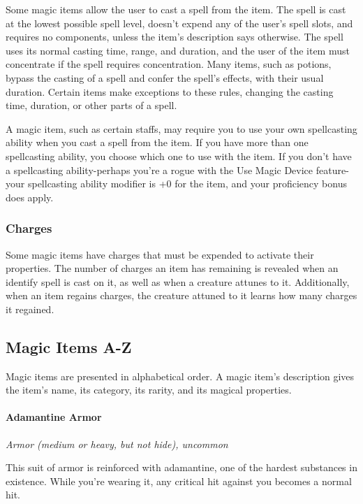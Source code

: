 \documentclass[
]{article}
\begin{document}
Some magic items allow the user to cast a spell from the item. The spell
is cast at the lowest possible spell level, doesn't expend any of the
user's spell slots, and requires no components, unless the item's
description says otherwise. The spell uses its normal casting time,
range, and duration, and the user of the item must concentrate if the
spell requires concentration. Many items, such as potions, bypass the
casting of a spell and confer the spell's effects, with their usual
duration. Certain items make exceptions to these rules, changing the
casting time, duration, or other parts of a spell.

A magic item, such as certain staffs, may require you to use your own
spellcasting ability when you cast a spell from the item. If you have
more than one spellcasting ability, you choose which one to use with the
item. If you don't have a spellcasting ability-perhaps you're a rogue
with the Use Magic Device feature-your spellcasting ability modifier is
+0 for the item, and your proficiency bonus does apply.

\hypertarget{charges}{%
\subsubsection{Charges}\label{charges}}

Some magic items have charges that must be expended to activate their
properties. The number of charges an item has remaining is revealed when
an identify spell is cast on it, as well as when a creature attunes to
it. Additionally, when an item regains charges, the creature attuned to
it learns how many charges it regained.

\hypertarget{magic-items-a-z}{%
\subsection{Magic Items A-Z}\label{magic-items-a-z}}

Magic items are presented in alphabetical order. A magic item's
description gives the item's name, its category, its rarity, and its
magical properties.

\hypertarget{adamantine-armor}{%
\paragraph{Adamantine Armor}\label{adamantine-armor}}

\emph{Armor (medium or heavy, but not hide), uncommon}

This suit of armor is reinforced with adamantine, one of the hardest
substances in existence. While you're wearing it, any critical hit
against you becomes a normal hit.
\end{document}
